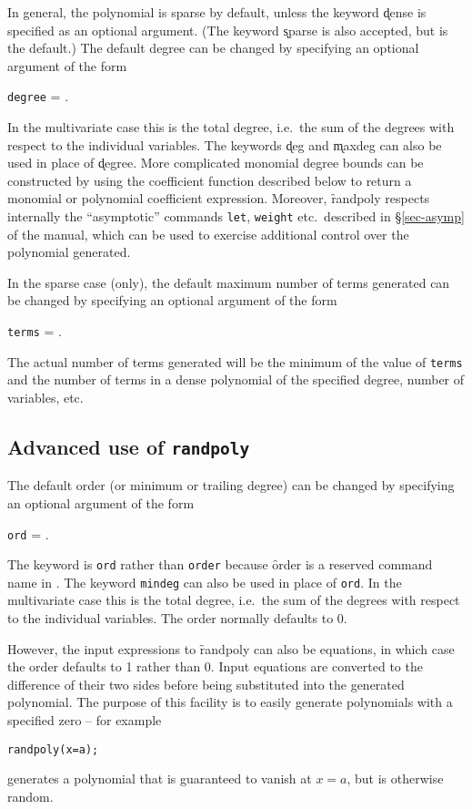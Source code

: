 In general, the polynomial is sparse by default, unless the keyword
\k{dense} is specified as an optional argument.  (The keyword \k{sparse}
is also accepted, but is the default.)  The default degree can
be changed by specifying an optional argument of the form
\begin{syntax}
  \texttt{degree} =  .
\end{syntax}
In the multivariate case this is the total degree, i.e.\ the sum of
the degrees with respect to the individual variables.  The keywords
\k{deg} and \k{maxdeg} can also be used in place of \k{degree}.
More complicated monomial degree bounds can be constructed by using
the coefficient function described below to return a monomial or
polynomial coefficient expression.  Moreover, \f{randpoly} respects
internally the \REDUCE ``asymptotic'' commands \texttt{let}, \texttt{weight}
etc.\ described in \S\ref{sec-asymp} of the \REDUCE{} manual, which can be used
to exercise additional control over the polynomial generated.

In the sparse case (only), the default maximum number of terms
generated can be changed by specifying an optional argument of the
form
\begin{syntax}
  \texttt{terms} =  .
\end{syntax}
The actual number of terms generated will be the minimum of the value
of \texttt{terms} and the number of terms in a dense polynomial of the
specified degree, number of variables, etc.


\subsection{Advanced use of \texttt{randpoly}}
\label{randpolysec:Advanced}

The default order (or minimum or trailing degree) can be changed by
specifying an optional argument of the form
\begin{syntax}
  \texttt{ord} =  .
\end{syntax}
The keyword is \texttt{ord} rather than \texttt{order} because \f{order}
is a reserved command name in \REDUCE\@.  The keyword \texttt{mindeg} can
also be used in place of \texttt{ord}.  In the multivariate case this is
the total degree, i.e.\ the sum of the degrees with respect to the
individual variables.  The order normally defaults to 0.

However, the input expressions to \f{randpoly} can also be
equations, in which case the order defaults to 1 rather than 0.  Input
equations are converted to the difference of their two sides before
being substituted into the generated polynomial.  The purpose of this
facility is to easily generate polynomials with a specified zero -- for
example
\begin{alltt}
  randpoly(x = a);
\end{alltt}
generates a polynomial that is guaranteed to vanish at $x = a$, but is
otherwise random.

